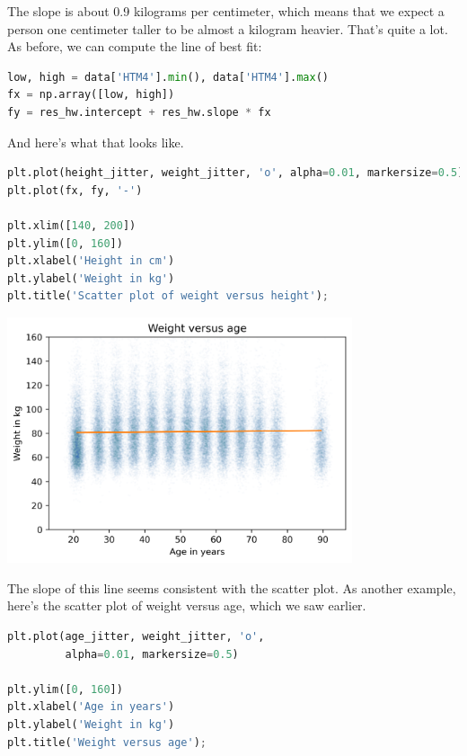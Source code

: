 The slope is about 0.9 kilograms per centimeter, which means that we
expect a person one centimeter taller to be almost a kilogram heavier.
That's quite a lot. As before, we can compute the line of best fit:

\begin{lstlisting}[language=Python,style=source]
low, high = data['HTM4'].min(), data['HTM4'].max()
fx = np.array([low, high])
fy = res_hw.intercept + res_hw.slope * fx
\end{lstlisting}

And here's what that looks like.

\begin{lstlisting}[language=Python,style=source]
plt.plot(height_jitter, weight_jitter, 'o', alpha=0.01, markersize=0.5)
plt.plot(fx, fy, '-')

plt.xlim([140, 200])
plt.ylim([0, 160])
plt.xlabel('Height in cm')
plt.ylabel('Weight in kg')
plt.title('Scatter plot of weight versus height');
\end{lstlisting}

\begin{center}
\includegraphics[width=4in]{chapters/09_relationships_files/09_relationships_107_0.png}
\end{center}

The slope of this line seems consistent with the scatter plot. As
another example, here's the scatter plot of weight versus age, which we
saw earlier.

\begin{lstlisting}[language=Python,style=source]
plt.plot(age_jitter, weight_jitter, 'o', 
         alpha=0.01, markersize=0.5)

plt.ylim([0, 160])
plt.xlabel('Age in years')
plt.ylabel('Weight in kg')
plt.title('Weight versus age');
\end{lstlisting}

